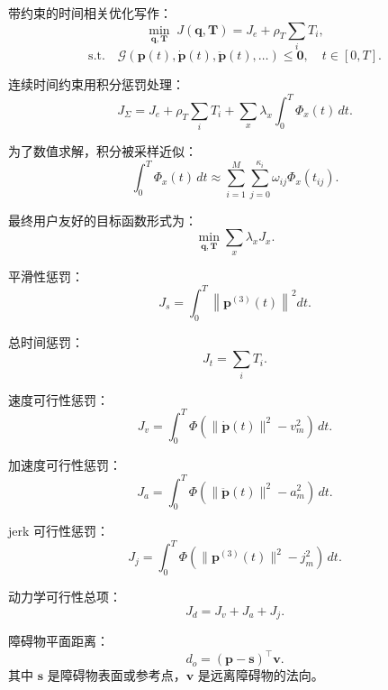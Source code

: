 ﻿\documentclass[UTF8,a4paper,11pt]{ctexart}
\begin{document}
带约束的时间相关优化写作：
\begin{equation}
\min_{\bm q,\bm T}\; J(\bm q,\bm T)
=J_e+\rho_T\sum_i T_i ,
\tag{4}
\end{equation}
\begin{equation}
\text{s.t.}\quad
\mathcal G(\bm p(t),\dot{\bm p}(t),\ddot{\bm p}(t),\ldots)\leq \bm 0,\quad t\in[0,T].
\tag{5}
\end{equation}

连续时间约束用积分惩罚处理：
\begin{equation}
J_\Sigma=J_e+\rho_T\sum_iT_i+
\sum_x\lambda_x\int_0^T \Phi_x(t)\,dt .
\tag{6}
\end{equation}

为了数值求解，积分被采样近似：
\begin{equation}
\int_0^T\Phi_x(t)\,dt
\approx
\sum_{i=1}^{M}\sum_{j=0}^{\kappa_i}
\omega_{ij}\Phi_x(t_{ij}) .
\tag{7}
\end{equation}

最终用户友好的目标函数形式为：
\begin{equation}
\min_{\bm q,\bm T}\sum_x\lambda_xJ_x .
\tag{8}
\end{equation}

平滑性惩罚：
\begin{equation}
J_s=\int_0^T\left\|\bm p^{(3)}(t)\right\|^2dt .
\tag{9}
\end{equation}

总时间惩罚：
\begin{equation}
J_t=\sum_iT_i .
\tag{10}
\end{equation}

速度可行性惩罚：
\begin{equation}
J_v=\int_0^T\Phi(\|\dot{\bm p}(t)\|^2-v_m^2)\,dt .
\tag{11}
\end{equation}

加速度可行性惩罚：
\begin{equation}
J_a=\int_0^T\Phi(\|\ddot{\bm p}(t)\|^2-a_m^2)\,dt .
\tag{12}
\end{equation}

jerk 可行性惩罚：
\begin{equation}
J_j=\int_0^T\Phi(\|\bm p^{(3)}(t)\|^2-j_m^2)\,dt .
\tag{13}
\end{equation}

动力学可行性总项：
\begin{equation}
J_d=J_v+J_a+J_j .
\tag{14}
\end{equation}

障碍物平面距离：
\begin{equation}
d_o=(\bm p-\bm s)^\top\bm v .
\tag{15}
\end{equation}
其中 $\bm s$ 是障碍物表面或参考点，$\bm v$ 是远离障碍物的法向。
\end{document}
